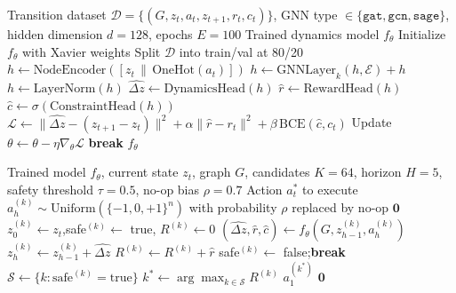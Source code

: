 \begin{algorithm}[H]
\caption{NetDream Dynamics Model Training}
\label{alg:training}
\begin{algorithmic}[1]
\REQUIRE Transition dataset $\mathcal{D} = \{(G, z_t, a_t, z_{t+1}, r_t, c_t)\}$,
         GNN type $\in \{\texttt{gat}, \texttt{gcn}, \texttt{sage}\}$,
         hidden dimension $d = 128$, epochs $E = 100$
\ENSURE Trained dynamics model $f_\theta$
\STATE Initialize $f_\theta$ with Xavier weights
\STATE Split $\mathcal{D}$ into train/val at 80/20
      \STATE $h \leftarrow \text{NodeEncoder}([z_t \,\|\, \text{OneHot}(a_t)])$
        \STATE $h \leftarrow \text{GNNLayer}_k(h, \mathcal{E}) + h$
        \STATE $h \leftarrow \text{LayerNorm}(h)$
      \ENDFOR
      \STATE $\hat{\Delta z} \leftarrow \text{DynamicsHead}(h)$
      \STATE $\hat{r} \leftarrow \text{RewardHead}(h)$
      \STATE $\hat{c} \leftarrow \sigma(\text{ConstraintHead}(h))$
      \STATE $\mathcal{L} \leftarrow \|\hat{\Delta z} - (z_{t+1} - z_t)\|^2
             + \alpha\|\hat{r} - r_t\|^2
             + \beta\, \text{BCE}(\hat{c}, c_t)$
    \ENDFOR
    \STATE Update $\theta \leftarrow \theta - \eta \nabla_\theta \mathcal{L}$
  \ENDFOR
    \STATE \textbf{break}
  \ENDIF
\ENDFOR
\RETURN $f_\theta$
\end{algorithmic}
\end{algorithm}

\begin{algorithm}[H]
\caption{NetDream-Safe: Imagination-Based MPC with Safety Filter}
\label{alg:planning}
\begin{algorithmic}[1]
\REQUIRE Trained model $f_\theta$, current state $z_t$, graph $G$,
         candidates $K = 64$, horizon $H = 5$, safety threshold $\tau = 0.5$,
         no-op bias $\rho = 0.7$
\ENSURE Action $a_t^*$ to execute
    \STATE $a^{(k)}_h \sim \text{Uniform}(\{-1,0,+1\}^n)$
      with probability $\rho$ replaced by no-op $\mathbf{0}$
  \ENDFOR
\ENDFOR
{}
  \STATE $z^{(k)}_0 \leftarrow z_t$,\quad safe$^{(k)} \leftarrow$ true,
         \quad $R^{(k)} \leftarrow 0$
    \STATE $(\hat{\Delta z}, \hat{r}, \hat{c}) \leftarrow f_\theta(G, z^{(k)}_{h-1}, a^{(k)}_h)$
    \STATE $z^{(k)}_h \leftarrow z^{(k)}_{h-1} + \hat{\Delta z}$
    \STATE $R^{(k)} \leftarrow R^{(k)} + \hat{r}$
      \STATE safe$^{(k)} \leftarrow$ false;\quad \textbf{break}
    \ENDIF
  \ENDFOR
\ENDFOR
\STATE $\mathcal{S} \leftarrow \{k : \text{safe}^{(k)} = \text{true}\}$
  \STATE $k^* \leftarrow \arg\max_{k \in \mathcal{S}} R^{(k)}$
  \RETURN $a^{(k^*)}_1$
\ELSE
  \RETURN $\mathbf{0}$ 
\ENDIF
\end{algorithmic}
\end{algorithm}

